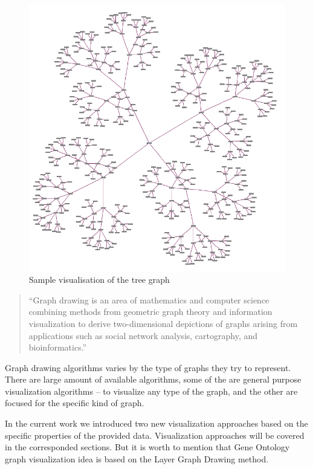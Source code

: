 \begin{figure}[h!]
\centering
\includegraphics[scale=0.3]{pictures/Tree_graph_example.png}
\caption{Sample visualisation of the tree graph}
\label{fig:tree_graph_example}
\end{figure}

\begin{quotation}
``Graph drawing is an area of mathematics and computer science combining methods from geometric graph theory and information visualization to derive two-dimensional depictions of graphs arising from applications such as social network analysis, cartography, and bioinformatics.''~\cite{Graph_drawing}
\end{quotation}

Graph drawing algorithms varies by the type of graphs they try to represent. There are large amount of available algorithms, some of the are general purpose visualization algorithms -- to visualize any type of the graph, and the other are focused for the specific kind of graph.

In the current work we introduced two new visualization approaches based on the specific properties of the provided data. Visualization approaches will be covered in the corresponded sections. But it is worth to mention that Gene Ontology graph visualization idea is based on the Layer Graph Drawing method.


